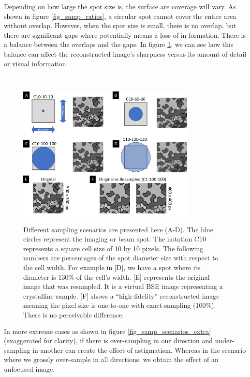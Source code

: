 \documentclass[12pt]{article}
\begin{document}
Depending on how large the spot size is, the surface are coverage will vary. As shown in
figure \ref{fig_samp_ratios}, a circular spot cannot cover the entire area without overlap. However,
when the spot size is small, there is no overlap, but there are significant gaps where potentially 
means a loss of in formation. There is a balance between the overlaps and the gaps. 
In figure \ref{fig_samp_scenarios}, we can see how this balance can affect the reconstructed image's
sharpness versus its amount of detail or visual information.

~\newline

\begin{figure}[h!]
\begin{center}
{
 \includegraphics[width=0.8\textwidth]{figures/spot_ratio/sampling_scenarios.pdf}
}
\caption{\label{fig_samp_scenarios} Different sampling scenarios are presented here (A-D). The blue circles represent the imaging or beam spot. The notation C10 represents a square cell size of 10 by 10 pixels. The following numbers are percentages of the spot diameter size with respect to the cell width. For example in [D], we have a spot where its diameter is 130\% of the cell's width. [E] represents the original image that was resampled. It is a virtual BSE image representing a crystalline sample. [F] shows a ``high-fidelity'' reconstructed image meaning the pixel size is one-to-one with exact-sampling (100\%). There is no perceivable difference.}
\end{center}
\end{figure}

\newpage

In more extreme cases as shown in figure \ref{fig_samp_scenarios_extra} (exaggerated for clarity), 
if there is over-sampling in one direction and under-sampling in another can create the effect of 
astigmatism. Whereas in the scenario where we grossly over-sample in all directions, we obtain the 
effect of an unfocused image.
\end{document}
